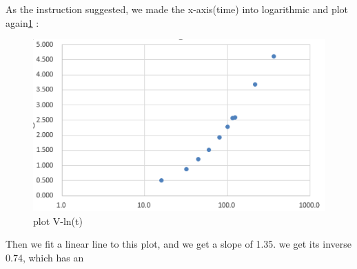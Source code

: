 \phantom{ } As the instruction suggested, we made the x-axis(time) into logarithmic and plot again\ref{fig:2.2} :\\
\begin{figure}[htbp]
	\centering %
	\includegraphics[width=\linewidth]{images/2_2.PNG} %
	\caption{plot V-ln(t)} %
	\label{fig:2.2} %
\end{figure}
\phantom{ } Then we fit a linear line to this plot, and we get a slope of 1.35.
we get its inverse 0.74, which has an 
	

